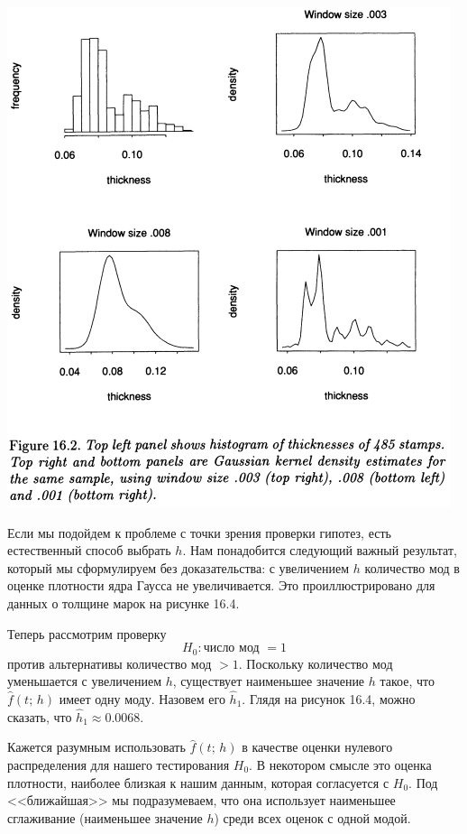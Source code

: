 \newpage
\noindent
\includegraphics[width=\linewidth]{16/f16.2.png}

Если мы подойдем к проблеме с точки зрения проверки гипотез, есть естественный способ выбрать $h$. Нам понадобится следующий важный результат, который мы сформулируем без доказательства: с увеличением $h$ количество мод в оценке плотности ядра Гаусса не увеличивается. Это проиллюстрировано для данных о толщине марок на рисунке 16.4.

Теперь рассмотрим проверку
\begin{equation}\label{eq16.20}
    H_0: \text{число мод } = 1 
\end{equation}
против альтернативы количество мод $> 1$. Поскольку количество мод уменьшается с увеличением $h$, существует наименьшее значение $h$ такое, что $\hat{f}(t;\, h)$ имеет одну моду. Назовем его $\hat{h}_1$. Глядя на рисунок 16.4, можно сказать, что $\hat{h}_1 \approx 0.0068$.

Кажется разумным использовать $\hat{f}(t;\, h)$ в качестве оценки нулевого распределения для нашего тестирования $H_0$. В некотором смысле это оценка плотности, наиболее близкая к нашим данным, которая согласуется с $H_0$. Под <<ближайшая>> мы подразумеваем, что она использует наименьшее сглаживание (наименьшее значение $h$) среди всех оценок с одной модой.

